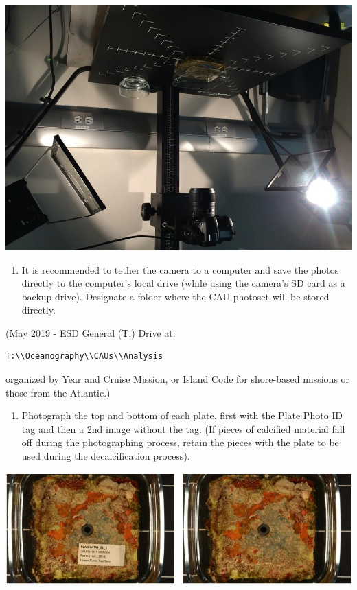 \documentclass[]{book}
\providecommand{\tightlist}{%
  \setlength{\itemsep}{0pt}\setlength{\parskip}{0pt}}
\begin{document}
\includegraphics{images/CAU_photograph.jpg}

\begin{enumerate}
\def\labelenumi{\arabic{enumi}.}
\setcounter{enumi}{6}
\tightlist
\item
  It is recommended to tether the camera to a computer and save the photos directly to the computer's local drive (while using the camera's SD card as a backup drive). Designate a folder where the CAU photoset will be stored directly.
\end{enumerate}

(May 2019 - ESD General (T:) Drive at:

\begin{verbatim}
T:\\Oceanography\\CAUs\\Analysis
\end{verbatim}

organized by Year and Cruise Mission, or Island Code for shore-based missions or those from the Atlantic.)

\begin{enumerate}
\def\labelenumi{\arabic{enumi}.}
\setcounter{enumi}{7}
\tightlist
\item
  Photograph the top and bottom of each plate, first with the Plate Photo ID tag and then a 2nd image without the tag. (If pieces of calcified material fall off during the photographing process, retain the pieces with the plate to be used during the decalcification process).
\end{enumerate}

\includegraphics{images/CAU_image.jpg}
\end{document}
